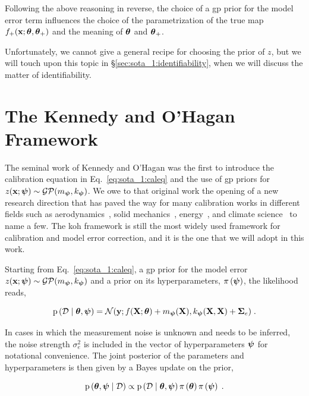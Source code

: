 \smallskip
Following the above reasoning in reverse, the choice of a \gls{gp} prior for the model error term influences the choice of the parametrization of the true map $f_+(\mathbf{x}; \boldsymbol{\theta}, \boldsymbol{\theta}_+)$ and the meaning of $\boldsymbol{\theta}$ and $\boldsymbol{\theta}_+$. 

\smallskip
Unfortunately, we cannot give a general recipe for choosing the prior of $z$, but we will touch upon this topic in \S\ref{sec:sota_1:identifiability}, when we will discuss the matter of identifiability.


\section{The Kennedy and O'Hagan Framework}
\label{sec:koh}

The seminal work of Kennedy and O'Hagan was the first to introduce the calibration equation in Eq.~\eqref{eq:sota_1:caleq} and the use of \gls{gp} priors for $z(\mathbf{x}; \boldsymbol{\psi}) \sim \mathcal{GP}(m_{\boldsymbol{\psi}},k_{\boldsymbol{\psi}})$. We owe to that original work the opening of a new research direction that has paved the way for many calibration works in different fields such as aerodynamics~\cite{rans_models,edeling2014,xiao2019,nadiga2019,doronina2020,damblin2016,DelVal_2022}, solid mechanics~\cite{solid_models,gally2020,maupin2020}, energy~\cite{energy_models}, and climate science~\cite{climate_models,climate_models_2} to name a few. The \gls{koh} framework is still the most widely used framework for calibration and model error correction, and it is the one that we will adopt in this work.

\smallskip
Starting from Eq.~\eqref{eq:sota_1:caleq}, a \gls{gp} prior for the model error $z(\mathbf{x};\boldsymbol{\psi}) \sim \mathcal{GP}(m_{\boldsymbol{\psi}},k_{\boldsymbol{\psi}})$ and a prior on its hyperparameters, $\pi \left( \boldsymbol{\psi}\right)$, the likelihood reads,

\begin{equation}
    \mathrm{p} \left( \mathcal{D} \mid \boldsymbol{\theta}, \boldsymbol{\psi} \right) = \mathcal{N}(\mathbf{y}; f(\mathbf{X}; \boldsymbol{\theta}) + m_{\boldsymbol{\psi}}(\mathbf{X}), k_{\boldsymbol{\psi}}(\mathbf{X},\mathbf{X}) + \boldsymbol{\Sigma}_e) \;.
\end{equation}

In cases in which the measurement noise is unknown and needs to be inferred, the noise strength $\sigma_e^2$ is included in the vector of hyperparameters $\boldsymbol{\psi}$ for notational convenience. The joint posterior of the parameters and hyperparameters is then given by a Bayes update on the prior,

\begin{equation}
    \mathrm{p} \left( \boldsymbol{\theta},\boldsymbol{\psi} \mid \mathcal{D} \right) \propto \mathrm{p} \left( \mathcal{D} \mid \boldsymbol{\theta}, \boldsymbol{\psi} \right) \pi \left( \boldsymbol{\theta}\right) \pi \left( \boldsymbol{\psi}\right) \;.
    \label{eq:sota_1:joint}
\end{equation}

